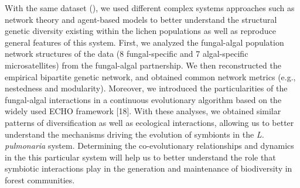 With the same dataset (\cite{dalgrande2012verticalandhorizontalphotobionttransmissionwithinpopulationsofalichensymbiosis}), we used different complex systems approaches such as network theory and agent-based models to better understand the structural genetic diversity existing within the lichen populations as well as reproduce general features of this system. First, we analyzed the fungal-algal population network structures of the data (8 fungal-specific and 7 algal-specific microsatellites) from the fungal-algal partnership. We then reconstructed the empirical bipartite genetic network, and obtained common network metrics (e.g., nestedness and modularity). Moreover, we introduced the particularities of the fungal-algal interactions in a continuous evolutionary algorithm based on the widely used ECHO framework [18]. With these analyses, we obtained similar patterns of diversification as well as ecological interactions, allowing us to better understand the mechanisms driving the evolution of symbionts in the {\em L. pulmonaria} system. Determining the co-evolutionary relationships and dynamics in the this particular system will help us to better understand the role that symbiotic interactions play in the generation and maintenance of biodiversity in forest communities.



